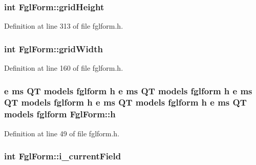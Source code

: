 \hypertarget{classFglForm_a9dc5de78bd4b0d7024831926f9cdc7d9}{
\subsubsection[{gridHeight}]{\setlength{\rightskip}{0pt plus 5cm}int {\bf FglForm::gridHeight}}}
\label{classFglForm_a9dc5de78bd4b0d7024831926f9cdc7d9}


Definition at line 313 of file fglform.h.

\hypertarget{classFglForm_a34347fff01950e4574b64c69b62d1ff2}{
\subsubsection[{gridWidth}]{\setlength{\rightskip}{0pt plus 5cm}int {\bf FglForm::gridWidth}}}
\label{classFglForm_a34347fff01950e4574b64c69b62d1ff2}


Definition at line 160 of file fglform.h.

\hypertarget{classFglForm_a2adf651bccc4bd01a985a0c5bde45af7}{
\subsubsection[{h}]{\setlength{\rightskip}{0pt plus 5cm}e ms QT models fglform {\bf h} e ms QT models fglform {\bf h} e ms QT models fglform {\bf h} e ms QT models fglform {\bf h} e ms QT models fglform {\bf FglForm::h}}}
\label{classFglForm_a2adf651bccc4bd01a985a0c5bde45af7}


Definition at line 49 of file fglform.h.

\hypertarget{classFglForm_ae7e903902c63ce3179656df4b684038f}{
\subsubsection[{i\_\-currentField}]{\setlength{\rightskip}{0pt plus 5cm}int {\bf FglForm::i\_\-currentField}}}
\label{classFglForm_ae7e903902c63ce3179656df4b684038f}



